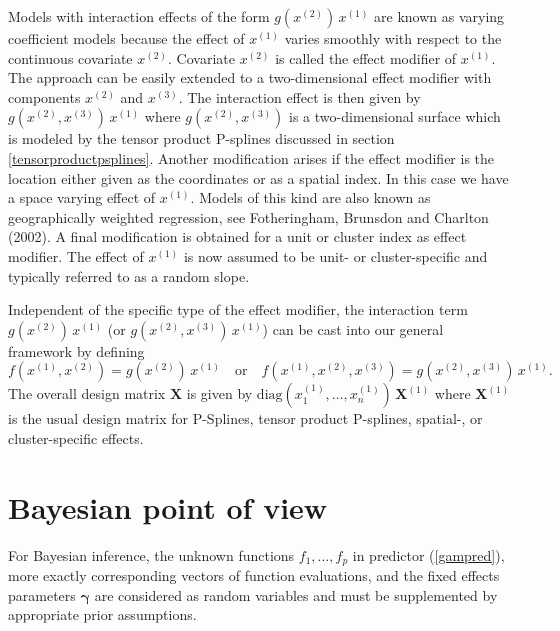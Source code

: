 \documentclass[11pt,a4paper,twoside]{bayesxarticle}
\newcommand{\diag}{\mbox{diag}}
\def \gammavec {\boldsymbol{\gamma}}
\def \Xvec {\mathbf{X}}
\begin{document}
Models with interaction effects of the form $g(x^{(2)}) \, x^{(1)}$
are  known as varying coefficient models  because the effect of
$x^{(1)}$ varies smoothly with respect to the continuous covariate
$x^{(2)}$. Covariate $x^{(2)}$ is called the effect modifier of
$x^{(1)}$. The approach can be easily extended to a two-dimensional
effect modifier with components $x^{(2)}$ and $x^{(3)}$. The
interaction effect is then given by $g(x^{(2)},x^{(3)}) \, x^{(1)}$
where $g(x^{(2)},x^{(3)})$ is a two-dimensional surface which is
modeled by the tensor product P-splines discussed in section
\ref{tensorproductpsplines}. Another modification arises if the
effect modifier is the location either given as the coordinates or
as a spatial index. In this case we have a space varying effect of
$x^{(1)}$. Models of this kind are also known as geographically
weighted regression, see Fotheringham, Brunsdon and Charlton (2002).
A final modification is obtained for a unit or cluster index as
effect modifier. The effect of $x^{(1)}$ is now assumed to be unit-
or cluster-specific and typically referred to as a random slope.

Independent of the specific type of the effect modifier, the interaction term $g\left(x^{(2)}\right) \, x^{(1)}$
(or $g\left(x^{(2)},x^{(3)}\right) \, x^{(1)}$) can be cast into our
general framework by defining
\begin{equation}
\label{gampspline_varcoeffterm}
f\left(x^{(1)},x^{(2)}\right) = g\left(x^{(2)}\right) \, x^{(1)} \quad \mbox{or} \quad  f\left(x^{(1)},x^{(2)},x^{(3)}\right) =
g\left(x^{(2)},x^{(3)}\right) \, x^{(1)}.
\end{equation}
The overall design matrix $\Xvec$ is given by
$\diag(x_{1}^{(1)},\dots,x_{n}^{(1)}) \, \Xvec^{(1)}$ where
$\Xvec^{(1)}$ is the usual design matrix for P-Splines, tensor
product P-splines, spatial-, or cluster-specific effects.



\section{Bayesian point of view}
\label{priorassumptions}

For Bayesian inference, the unknown functions $f_{1},\dots ,f_{p}$
in predictor (\ref{gampred}), more exactly corresponding vectors of
function evaluations, and the fixed effects parameters $\gammavec$ are
considered as random variables and must be supplemented by
appropriate prior assumptions.
\end{document}
